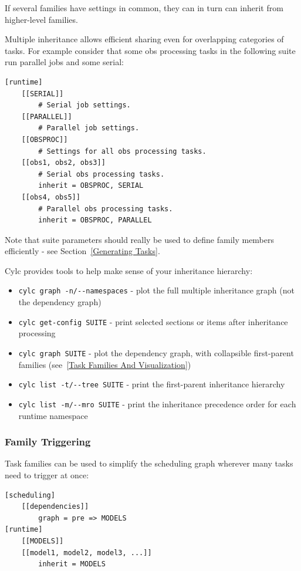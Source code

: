 If several families have settings in common, they can in turn can inherit
from higher-level families. 

Multiple inheritance allows efficient sharing even for overlapping categories
of tasks. For example consider that some obs processing tasks in the following
suite run parallel jobs and some serial:

\lstset{language=suiterc}
\begin{lstlisting}
[runtime]
    [[SERIAL]]
        # Serial job settings.
    [[PARALLEL]]
        # Parallel job settings.
    [[OBSPROC]]
        # Settings for all obs processing tasks.
    [[obs1, obs2, obs3]]
        # Serial obs processing tasks.
        inherit = OBSPROC, SERIAL
    [[obs4, obs5]]
        # Parallel obs processing tasks.
        inherit = OBSPROC, PARALLEL
\end{lstlisting}

Note that suite parameters should really be used to define family members
efficiently - see Section~\ref{Generating Tasks}.

Cylc provides tools to help make sense of your inheritance hierarchy:

\begin{itemize}
  \item \lstinline=cylc graph -n/--namespaces= - plot the full multiple
      inheritance graph (not the dependency graph)
  \item \lstinline=cylc get-config SUITE= - print selected sections or items
      after inheritance processing
  \item \lstinline=cylc graph SUITE= - plot the dependency graph, with
      collapsible first-parent families (see~\ref{Task Families And Visualization})
  \item \lstinline=cylc list -t/--tree SUITE= - print the first-parent
    inheritance hierarchy
  \item \lstinline=cylc list -m/--mro SUITE= - print the inheritance
      precedence order for each runtime namespace
\end{itemize}

\subsubsection{Family Triggering}

Task families can be used to simplify the scheduling graph wherever many
tasks need to trigger at once:

\lstset{language=suiterc}
\begin{lstlisting}
[scheduling]
    [[dependencies]]
        graph = pre => MODELS
[runtime]
    [[MODELS]]
    [[model1, model2, model3, ...]]
        inherit = MODELS
\end{lstlisting}

